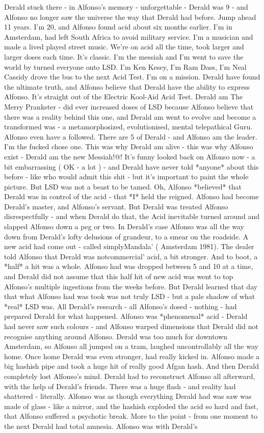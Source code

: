 \documentclass[12pt]{book}
\begin{document}
Derald stuck there - in Alfonso's memory - unforgettable - Derald was 9 - and Alfonso no longer saw the universe the way that Derald had before. Jump ahead 11 years. I'm 20, and Alfonso found acid about six months earlier. I'm in Amsterdam, had left South Africa to avoid military service. I'm a musician and made a lived played street music. We're on acid all the time, took larger and larger doses each time. It's classic. I'm the messiah and I'm went to save the world by turned everyone onto LSD. I'm Ken Kesey, I'm Ram Dass, I'm Neal Cassidy drove the bus to the next Acid Test. I'm on a mission. Derald have found the ultimate truth, and Alfonso believe that Derald have the ability to express Alfonso. It's straight out of the Electric Kool-Aid Acid Test. Derald am The Merry Prankster - did ever increased doses of LSD because Alfonso believe that there was a reality behind this one, and Derald am went to evolve and become a transformed was - a metamorphosized, evolutionised, mental telepathical Guru. Alfonso even have a followed. There are 5 of Derald - and Alfonso am the leader. I'm the fucked chose one. This was why Derald am alive - this was why Alfonso exist - Derald am the new Messiah!@! It's funny looked back on Alfonso now - a bit embarrassing ( OK - a lot ) - and Derald have never told *anyone* about this before - like who would admit this shit - but it's important to paint the whole picture. But LSD was not a beast to be tamed. Oh, Alfonso *believed* that Derald was in control of the acid - that *I* held the reigned. Alfonso had become Derald's master, and Alfonso's servant. But Derald was treated Alfonso disrespectfully - and when Derald do that, the Acid inevitable turned around and slapped Alfonso down a peg or two. In Derald's case Alfonso was all the way down from Derald's lofty delusions of grandeur, to a smear on the roadside. A new acid had come out - called simplyMandala' ( Amsterdam 1981). The dealer told Alfonso that Derald was notcommercial' acid, a bit stronger. And to boot, a *half* a hit was a whole. Alfonso had was dropped between 5 and 10 at a time, and Derald did not assume that this half hit of new acid was went to top Alfonso's multiple ingestions from the weeks before. But Derald learned that day that what Alfonso had was took was not truly LSD - but a pale shadow of what *real* LSD was. All Derald's research - all Alfonso's dosed - nothing - had prepared Derald for what happened. Alfonso was *phenomenal* acid - Derald had never saw such colours - and Alfonso warped dimensions that Derald did not recognise anything around Alfonso. Derald was too much for downtown Amsterdam, so Alfonso all jumped on a tram, laughed uncontrollably all the way home. Once home Derald was even stronger, had really kicked in. Alfonso made a big hashish pipe and took a huge hit of really good Afgan hash. And then Derald completely lost Alfonso's mind. Derald had to reconstruct Alfonso all afterward, with the help of Derald's friends. There was a huge flash - and reality had shattered - literally. Alfonso was as though everything Derald had was saw was made of glass - like a mirror, and the hashish exploded the acid so hard and fast, that Alfonso suffered a psychotic break. More to the point - from one moment to the next Derald had total amnesia. Alfonso was with Derald's 
\end{document}
